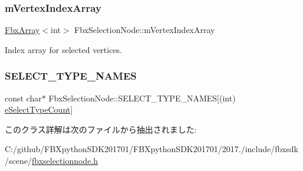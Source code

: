 \mbox{\label{class_fbx_selection_node_ad58af0a699e64661e138fc9c17cb33c2}} 
\subsubsection{\texorpdfstring{m\+Vertex\+Index\+Array}{mVertexIndexArray}}
{\footnotesize\ttfamily \hyperlink{class_fbx_array}{Fbx\+Array}$<$int$>$ Fbx\+Selection\+Node\+::m\+Vertex\+Index\+Array}

Index array for selected vertices. \mbox{\label{class_fbx_selection_node_ad7174a58a6d0031ac615900251821fd5}} 
\subsubsection{\texorpdfstring{S\+E\+L\+E\+C\+T\+\_\+\+T\+Y\+P\+E\+\_\+\+N\+A\+M\+ES}{SELECT\_TYPE\_NAMES}}
{\footnotesize\ttfamily const char$\ast$ Fbx\+Selection\+Node\+::\+S\+E\+L\+E\+C\+T\+\_\+\+T\+Y\+P\+E\+\_\+\+N\+A\+M\+ES\mbox{[}(int) \hyperlink{class_fbx_selection_node_aa24cf47b60ff436a1cce9409da37e78fa6f7e60aadbb76284e3352814a5a4f299}{e\+Select\+Type\+Count}\mbox{]}\hspace{0.3cm}{\ttfamily [static]}}



このクラス詳解は次のファイルから抽出されました\+:\begin{DoxyCompactItemize}
\item 
C\+:/github/\+F\+B\+Xpython\+S\+D\+K201701/\+F\+B\+Xpython\+S\+D\+K201701/2017./include/fbxsdk/scene/\hyperlink{fbxselectionnode_8h}{fbxselectionnode.\+h}\end{DoxyCompactItemize}
